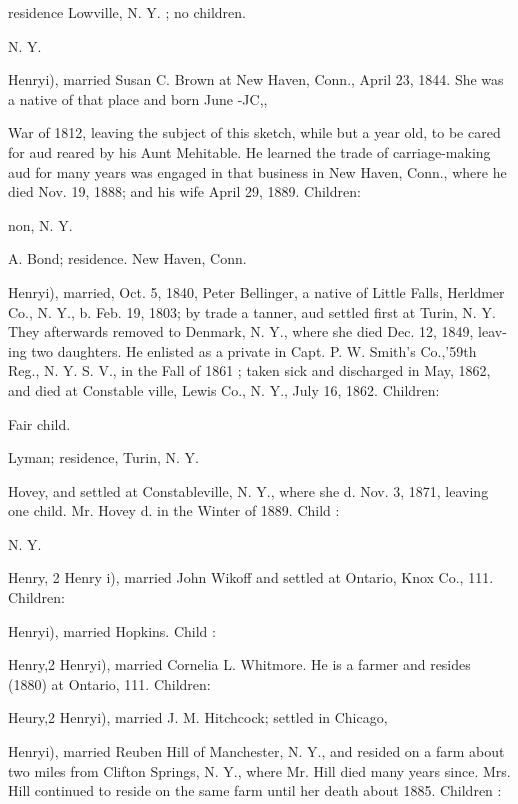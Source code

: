 \documentclass[oneside]{book}
\begin{document}
residence Lowville, N. Y. ; no children. 

N. Y. 

Henryi), married Susan C. Brown at New Haven, Conn., April 
23, 1844. She was a native of that place and born June -JC,, 




War of 1812, leaving the subject of this sketch, while but a year 
old, to be cared for aud reared by his Aunt Mehitable. He 
learned the trade of carriage-making aud for many years was 
engaged in that business in New Haven, Conn., where he died 
Nov. 19, 1888; and his wife April 29, 1889. Children: 

non, N. Y. 


A. Bond; residence. New Haven, Conn. 


Henryi), married, Oct. 5, 1840, Peter Bellinger, a native of 
Little Falls, Herldmer Co., N. Y., b. Feb. 19, 1803; by trade a 
tanner, aud settled first at Turin, N. Y. They afterwards 
removed to Denmark, N. Y., where she died Dec. 12, 1849, leav- 
ing two daughters. He enlisted as a private in Capt. P. W. 
Smith's Co.,'59th Reg., N. Y. S. V., in the Fall of 1861 ; taken 
sick and discharged in May, 1862, and died at Constable ville, 
Lewis Co., N. Y., July 16, 1862. Children: 


Fair child. 


Lyman; residence, Turin, N. Y. 


Hovey, and settled at Constableville, N. Y., where she d. 
Nov. 3, 1871, leaving one child. Mr. Hovey d. in the Winter 
of 1889. Child : 

N. Y. 

Henry, 2 Henry i), married John Wikoff and settled at Ontario, 
Knox Co., 111. Children: 






Henryi), married Hopkins. Child : 


Henry,2 Henryi), married Cornelia L. Whitmore. He is a farmer 
and resides (1880) at Ontario, 111. Children: 





Heury,2 Henryi), married J. M. Hitchcock; settled in Chicago, 



Henryi), married Reuben Hill of Manchester, N. Y., and resided 
on a farm about two miles from Clifton Springs, N. Y., where 
Mr. Hill died many years since. Mrs. Hill continued to reside 
on the same farm until her death about 1885. Children : 
\end{document}
